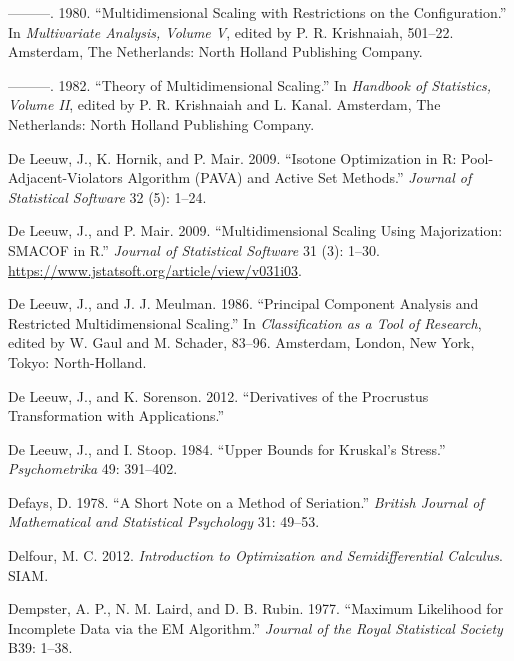 \documentclass[
  12pt,
  letterpaper,
  DIV=11,
  numbers=noendperiod]{scrreprt}
\newlength{\cslhangindent}
\newenvironment{CSLReferences}[2] %
 {\begin{list}{}{%
  \setlength{\itemindent}{0pt}
  \setlength{\leftmargin}{0pt}
  \setlength{\parsep}{0pt}
  \ifodd #1
   \setlength{\leftmargin}{\cslhangindent}
   \setlength{\itemindent}{-1\cslhangindent}
  \fi
  \setlength{\itemsep}{#2\baselineskip}}}
 {\end{list}}
\theoremstyle{remark}
\begin{document}
\begin{CSLReferences}{1}{0}
---------. 1980. {``Multidimensional Scaling with Restrictions on the
Configuration.''} In \emph{Multivariate Analysis, Volume {V}}, edited by
P. R. Krishnaiah, 501--22. Amsterdam, The Netherlands: North Holland
Publishing Company.

---------. 1982. {``Theory of Multidimensional Scaling.''} In
\emph{Handbook of Statistics, Volume {II}}, edited by P. R. Krishnaiah
and L. Kanal. Amsterdam, The Netherlands: North Holland Publishing
Company.

De Leeuw, J., K. Hornik, and P. Mair. 2009. {``{Isotone Optimization in
R: Pool-Adjacent-Violators Algorithm (PAVA) and Active Set Methods}.''}
\emph{Journal of Statistical Software} 32 (5): 1--24.

De Leeuw, J., and P. Mair. 2009. {``{Multidimensional Scaling Using
Majorization: SMACOF in R}.''} \emph{Journal of Statistical Software} 31
(3): 1--30. \url{https://www.jstatsoft.org/article/view/v031i03}.

De Leeuw, J., and J. J. Meulman. 1986. {``Principal Component Analysis
and Restricted Multidimensional Scaling.''} In \emph{Classification as a
Tool of Research}, edited by W. Gaul and M. Schader, 83--96. Amsterdam,
London, New York, Tokyo: North-Holland.

De Leeuw, J., and K. Sorenson. 2012. {``{Derivatives of the Procrustus
Transformation with Applications}.''}

De Leeuw, J., and I. Stoop. 1984. {``Upper Bounds for Kruskal's
Stress.''} \emph{Psychometrika} 49: 391--402.

Defays, D. 1978. {``{A Short Note on a Method of Seriation}.''}
\emph{British Journal of Mathematical and Statistical Psychology} 31:
49--53.

Delfour, M. C. 2012. \emph{Introduction to Optimization and
Semidifferential Calculus}. SIAM.

Dempster, A. P., N. M. Laird, and D. B. Rubin. 1977. {``{Maximum
Likelihood for Incomplete Data via the EM Algorithm}.''} \emph{Journal
of the Royal Statistical Society} B39: 1--38.


\end{CSLReferences}
\end{document}

